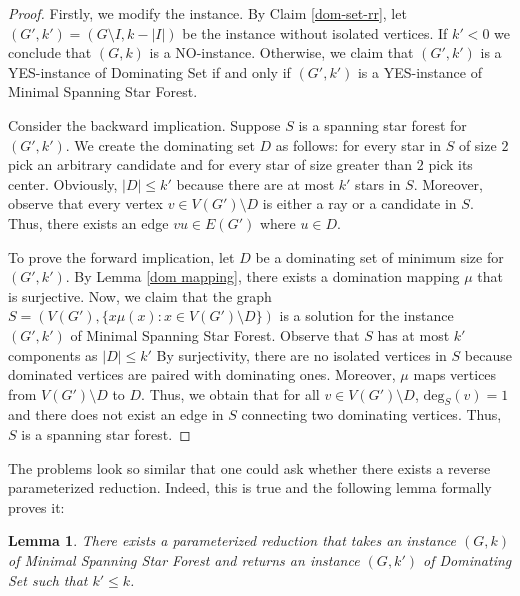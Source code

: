 \documentclass[en]{pracamgr}
\newtheorem{lemma}{Lemma}
\theoremstyle{definition}
\newcommand{\mssfp}{{\sc Minimal Spanning Star Forest}}
\newcommand{\domset}{dominating set}
\newcommand{\domsetp}{{\sc Dominating Set}}
\newcommand{\degree}[2]{\textrm{deg}_{#1}(#2)}
\begin{document}
\begin{proof}
	Firstly, we modify the instance. By Claim \ref{dom-set-rr}, let $(G',k')=(G \setminus I, k - |I|)$ be the instance without isolated vertices. If $k' < 0$ we conclude that $(G,k)$ is a NO-instance. Otherwise, we claim that $(G',k')$ is a YES-instance of \domsetp{} if and only if $(G',k')$ is a YES-instance of \mssfp{}. 
	
	Consider the backward implication. Suppose $S$ is a spanning star forest for $(G',k')$. We create the \domset{} $D$ as follows: for every star in $S$ of size $2$ pick an arbitrary candidate and for every star of size greater than $2$ pick its center. Obviously, $|D| \leq k'$ because there are at most $k'$ stars in $S$. Moreover, observe that every vertex $v \in V(G') \setminus D$ is either a ray or a candidate in $S$. Thus, there exists an edge $vu \in E(G')$ where $u \in D$.
	
	To prove the forward implication, let $D$ be a dominating set of minimum size for $(G',k')$. By Lemma \ref{dom mapping}, there exists a domination mapping $\mu$ that is surjective. Now, we claim that the graph $S=(V(G'),\{x\mu(x): x \in V(G') \setminus D\})$ is a solution for the instance $(G',k')$ of \mssfp{}. Observe that $S$ has at most $k'$ components as $|D| \leq k'$ By surjectivity, there are no isolated vertices in $S$ because dominated vertices are paired with dominating ones. Moreover, $\mu$ maps vertices from $V(G') \setminus D$ to $D$. Thus, we obtain that for all $v \in V(G') \setminus D$, $\degree{S}{v}=1$ and there does not exist an edge in $S$ connecting two dominating vertices. Thus, $S$ is a spanning star forest.
\end{proof}

The problems look so similar that one could ask whether there exists a reverse parameterized reduction. Indeed, this is true and the following lemma formally proves it:

\begin{lemma}\label{ssf-dom reduction}
	There exists a parameterized reduction that takes an instance $(G,k)$ of \mssfp{} and returns an instance $(G,k')$ of \domsetp{} such that $k' \leq k$. 
\end{lemma}
\end{document}
